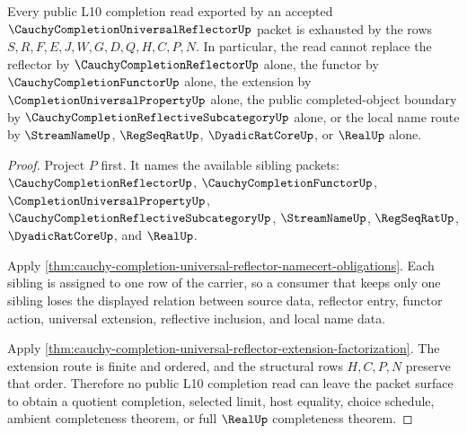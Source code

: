 \begin{theorem}
\label{thm:cauchy-completion-universal-reflector-nonescape}
Every public L10 completion read exported by an accepted $\CauchyCompletionUniversalReflectorUp$ packet is exhausted by the rows $S,R,F,E,J,W,G,D,Q,H,C,P,N$. In particular, the read cannot replace the reflector by $\CauchyCompletionReflectorUp$ alone, the functor by $\CauchyCompletionFunctorUp$ alone, the extension by $\CompletionUniversalPropertyUp$ alone, the public completed-object boundary by $\CauchyCompletionReflectiveSubcategoryUp$ alone, or the local name route by $\StreamNameUp$, $\RegSeqRatUp$, $\DyadicRatCoreUp$, or $\RealUp$ alone.
\end{theorem}
\begin{proof}
Project $P$ first. It names the available sibling packets: $\CauchyCompletionReflectorUp$, $\CauchyCompletionFunctorUp$, $\CompletionUniversalPropertyUp$, $\CauchyCompletionReflectiveSubcategoryUp$, $\StreamNameUp$, $\RegSeqRatUp$, $\DyadicRatCoreUp$, and $\RealUp$.

Apply \autoref{thm:cauchy-completion-universal-reflector-namecert-obligations}. Each sibling is assigned to one row of the carrier, so a consumer that keeps only one sibling loses the displayed relation between source data, reflector entry, functor action, universal extension, reflective inclusion, and local name data.

Apply \autoref{thm:cauchy-completion-universal-reflector-extension-factorization}. The extension route is finite and ordered, and the structural rows $H,C,P,N$ preserve that order. Therefore no public L10 completion read can leave the packet surface to obtain a quotient completion, selected limit, host equality, choice schedule, ambient completeness theorem, or full $\RealUp$ completeness theorem.
\end{proof}

